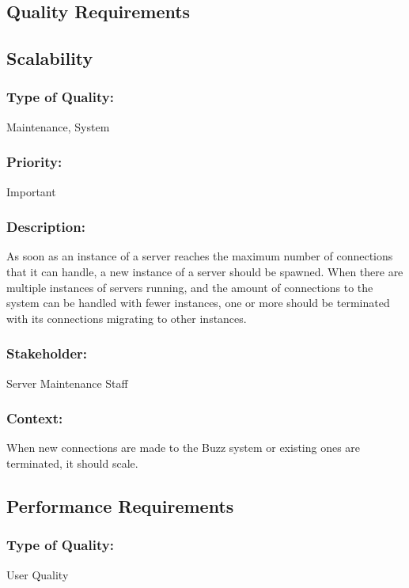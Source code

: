 \documentclass[11pt]{article}
\begin{document}
	\newpage
	\begin{center}
	\section{\textbf{\huge{Quality Requirements}}}
	\end{center}
	\subsection{Scalability}
		\subsubsection{Type of Quality:}
			\textbf{}Maintenance, System
		
		\subsubsection{Priority:}
			\textbf{}Important 
		
		\subsubsection{Description:}
			\textbf{}As soon as an instance of a server reaches the maximum number of connections that it can handle, a new instance of a server should be spawned. When there are multiple instances of servers running, and the amount of connections to the system can be handled with fewer instances, one or more should be terminated with its connections migrating to other instances.
		
		\subsubsection{Stakeholder:}
			\textbf{}Server Maintenance Staff

		\subsubsection{Context:}
			\textbf{}When new connections are made to the Buzz system or existing ones are terminated, it should scale.
		
	\subsection{Performance Requirements}
		\subsubsection{Type of Quality:}
			\textbf{}User Quality
		
\end{document}
